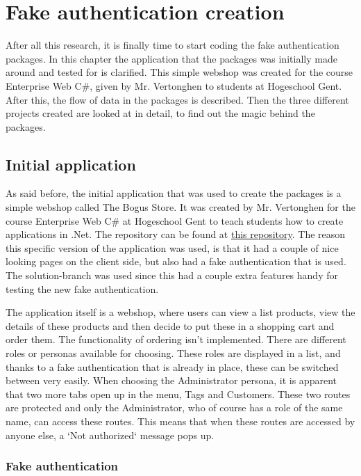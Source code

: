 \chapter{Fake authentication creation}
\label{ch:fake-auth2}

After all this research, it is finally time to start coding the fake authentication packages. In this chapter the application that the packages was initially made around and tested for is clarified. This simple webshop was created for the course Enterprise Web C\#, given by Mr. Vertonghen to students at Hogeschool Gent. After this, the flow of data in the packages is described. Then the three different projects created are looked at in detail, to find out the magic behind the packages.

\section{Initial application}

As said before, the initial application that was used to create the packages is a simple webshop called The Bogus Store. It was created by Mr. Vertonghen for the course Enterprise Web C\# at Hogeschool Gent to teach students how to create applications in .Net. The repository can be found at \href{https://github.com/HOGENT-Web/csharp-ch-8-example-2}{this repository}. The reason this specific version of the application was used, is that it had a couple of nice looking pages on the client side, but also had a fake authentication that is used. The solution-branch was used since this had a couple extra features handy for testing the new fake authentication.

The application itself is a webshop, where users can view a list products, view the details of these products and then decide to put these in a shopping cart and order them. The functionality of ordering isn't implemented. There are different roles or personas available for choosing. These roles are displayed in a list, and thanks to a fake authentication that is already in place, these can be switched between very easily. When choosing the Administrator persona, it is apparent that two more tabs open up in the menu, Tags and Customers. These two routes are protected and only the Administrator, who of course has a role of the same name, can access these routes. This means that when these routes are accessed by anyone else, a `Not authorized` message pops up.

\subsection{Fake authentication}


